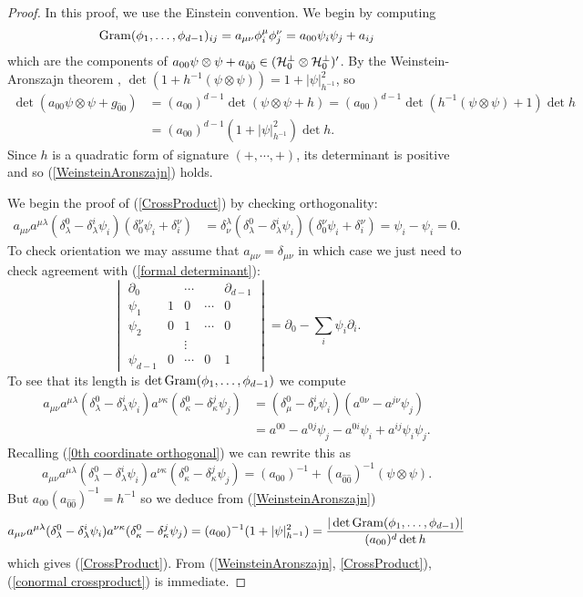 \begin{proof}
In this proof, we use the Einstein convention.
We begin by computing
$$\operatorname{Gram}(\phi_1, \dots, \phi_{d - 1})_{ij} = a_{\mu \nu} \phi_i^\mu \phi_j^\nu = a_{00} \psi_i \psi_j + a_{ij}$$
which are the components of $a_{00}\psi \otimes \psi + a_{\hat 0 \hat 0} \in (\mathcal H_0^\perp \otimes \mathcal H_0^\perp)'$.
By the Weinstein-Aronszajn theorem \cite{Tao13}, $\det(1 + h^{-1}(\psi \otimes \psi)) = 1 + |\psi|_{h^{-1}}^2$, so
\begin{align*}
\det(a_{00}\psi \otimes \psi + g_{\hat 0 \hat 0})
&= (a_{00})^{d - 1} \det(\psi \otimes \psi + h) = (a_{00})^{d - 1} \det(h^{-1}(\psi \otimes \psi) + 1) \det h \\
&= (a_{00})^{d - 1} (1 + |\psi|_{h^{-1}}^2) \det h.
\end{align*}
Since $h$ is a quadratic form of signature $(+, \cdots, +)$, its determinant is positive and so (\ref{WeinsteinAronszajn}) holds.

We begin the proof of (\ref{CrossProduct}) by checking orthogonality:
\begin{align*}
a_{\mu\nu} a^{\mu \lambda} (\delta^0_\lambda - \delta^i_\lambda \psi_i)(\delta^\nu_0 \psi_i + \delta^\nu_i)
&= \delta^\lambda_\nu (\delta^0_\lambda - \delta^i_\lambda \psi_i)(\delta^\nu_0 \psi_i + \delta_i^\nu)
= \psi_i - \psi_i = 0.
\end{align*}
To check orientation we may assume that $a_{\mu\nu} = \delta_{\mu\nu}$ in which case we just need to check agreement with (\ref{formal determinant}):
$$\begin{vmatrix} \partial_0 && \cdots && \partial_{d - 1} \\
\psi_1 & 1 & 0 & \cdots & 0 \\
\psi_2 & 0 & 1 & \cdots & 0\\
&& \vdots \\
\psi_{d - 1} & 0 & \cdots & 0 & 1
\end{vmatrix} = \partial_0 - \sum_i \psi_i \partial_i.$$
To see that its length is $\det \operatorname{Gram}(\phi_1, \dots, \phi_{d - 1})$ we compute
\begin{align*}
a_{\mu \nu} a^{\mu \lambda}(\delta^0_\lambda - \delta^i_\lambda \psi_i) a^{\nu \kappa}(\delta_\kappa^0 - \delta_\kappa^j \psi_j)
&= (\delta_\mu^0 - \delta_\nu^i \psi_i)(a^{0 \nu} - a^{j \nu} \psi_j)\\
&= a^{00} - a^{0j} \psi_j - a^{0i} \psi_i + a^{ij} \psi_i \psi_j.
\end{align*}
Recalling (\ref{0th coordinate orthogonal}) we can rewrite this as
$$a_{\mu \nu} a^{\mu \lambda}(\delta^0_\lambda - \delta^i_\lambda \psi_i) a^{\nu \kappa}(\delta_\kappa^0 - \delta_\kappa^j \psi_j) = (a_{00})^{-1} + (a_{\hat 0 \hat 0})^{-1}(\psi \otimes \psi).$$
But $a_{00} (a_{\hat 0 \hat 0})^{-1} = h^{-1}$ so we deduce from (\ref{WeinsteinAronszajn})
$$a_{\mu \nu} a^{\mu \lambda}(\delta^0_\lambda - \delta^i_\lambda \psi_i) a^{\nu \kappa}(\delta_\kappa^0 - \delta_\kappa^j \psi_j) = (a_{00})^{-1} (1 + |\psi|_{h^{-1}}^2)
= \frac{|\det \operatorname{Gram}(\phi_1, \dots, \phi_{d - 1})|}{(a_{00})^d \det h}$$
which gives (\ref{CrossProduct}).
From (\ref{WeinsteinAronszajn}, \ref{CrossProduct}), (\ref{conormal crossproduct}) is immediate.
\end{proof}


